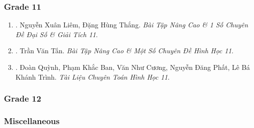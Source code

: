\documentclass{article}
\begin{document}
\subsubsection{Grade 11}

\begin{enumerate}
	\item \cite{Liem_Thang2020}. Nguyễn Xuân Liêm, Đặng Hùng Thắng. \textit{Bài Tập Nâng Cao \& 1 Số Chuyên Đề Đại Số \& Giải Tích 11}.\hfill{\sf[bought]}
	\item \cite{Tan2017}. Trần Văn Tấn. \textit{Bài Tập Nâng Cao \& Một Số Chuyên Đề Hình Học 11}.\hfill{\sf[bought]}
	\item \cite{TL_chuyen_Toan_hinh_hoc_11}. Đoàn Quỳnh, Phạm Khắc Ban, Văn Như Cương, Nguyễn Đăng Phất, Lê Bá Khánh Trình. \textit{Tài Liệu Chuyên Toán Hình Học 11}.\hfill{\sf[bought]}	
\end{enumerate}

\subsubsection{Grade 12}

\subsubsection{Miscellaneous}
\end{document}
